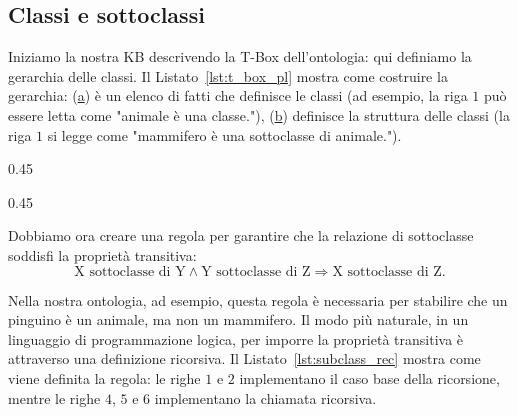 \subsection{Classi e sottoclassi}
Iniziamo la nostra KB descrivendo la T-Box dell'ontologia: qui definiamo la gerarchia delle classi. Il Listato~\ref{lst:t_box_pl} mostra come costruire la gerarchia: (\hyperref[lst:t_box_pl_class]{a}) è un elenco di fatti che definisce le classi (ad esempio, la riga $1$ può essere letta come "animale è una classe."), (\hyperref[lst:t_box_pl_subclass]{b}) definisce la struttura delle classi (la riga $1$ si legge come "mammifero è una sottoclasse di animale.").

\begin{listingenv}[h]
	\centering
	\begin{sublisting}[c]{0.45\linewidth}
		\caption{Definizioni delle classi}
		\label{lst:t_box_pl_class}
	\end{sublisting}
	\qquad
	\begin{sublisting}[c]{0.45\linewidth}
		\caption{Definizioni delle sottoclassi}
		\label{lst:t_box_pl_subclass}
	\end{sublisting}
	\caption{Definizione della T-Box}
	\label{lst:t_box_pl}
\end{listingenv}

Dobbiamo ora creare una regola per garantire che la relazione di sottoclasse soddisfi la proprietà transitiva:
\[
\text{X sottoclasse di Y}\land\text{Y sottoclasse di Z}\Rightarrow\text{X sottoclasse di Z.}
\]

Nella nostra ontologia, ad esempio, questa regola è necessaria per stabilire che un pinguino è un animale, ma non un mammifero. Il modo più naturale, in un linguaggio di programmazione logica, per imporre la proprietà transitiva è attraverso una definizione ricorsiva. Il Listato~\ref{lst:subclass_rec} mostra come viene definita la regola: le righe $1$ e $2$ implementano il caso base della ricorsione, mentre le righe $4$, $5$ e $6$ implementano la chiamata ricorsiva.

\begin{listingenv}[h]
	\caption{Definizione ricorsiva del predicato sottoclasse}
	\label{lst:subclass_rec}
\end{listingenv}

